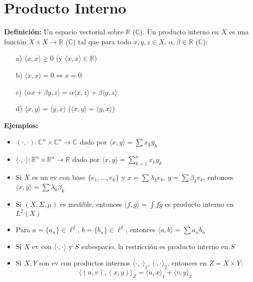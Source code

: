 \documentclass{article}
\begin{document}

\section*{Producto Interno}

\textbf{Definición:} Un espacio vectorial sobre $\mathbb{R}$ ($\mathbb{C}$). Un producto interno en $X$ es una función $X \times X \to \mathbb{R}$ ($\mathbb{C}$) tal que para todo $x, y, z \in X$, $\alpha, \beta \in \mathbb{R}$ ($\mathbb{C}$):
\begin{itemize}
    \item[a)] $\langle x, x \rangle \ge 0$ (y $\langle x, x \rangle \in \mathbb{R}$)
    \item[b)] $\langle x, x \rangle = 0 \iff x = 0$
    \item[c)] $\langle \alpha x + \beta y, z \rangle = \alpha \langle x, z \rangle + \beta \langle y, z \rangle$
    \item[d)] $\langle x, y \rangle = \langle y, x \rangle$ \quad ($\langle x, y \rangle = \overline{\langle y, x \rangle}$)
\end{itemize}

\textbf{Ejemplos:}
\begin{itemize}
    \item $(\cdot, \cdot): \mathbb{C}^n \times \mathbb{C}^n \to \mathbb{C}$ dado por $\langle x, y \rangle = \sum x_k \bar{y}_k$
    \item $\langle \cdot, \cdot \rangle: \mathbb{R}^n \times \mathbb{R}^n \to \mathbb{R}$ dado por $\langle x, y \rangle = \sum_{k=1}^n x_k y_k$
    \item Si $X$ es un ev con base $\{e_1, \dots, e_k\}$ y $x = \sum \lambda_k e_k$, $y = \sum \beta_k e_k$, entonces $\langle x, y \rangle = \sum \lambda_k \bar{\beta}_k$
    \item Si $(X, \Sigma, \mu)$ es medible, entonces $\langle f, g \rangle = \int f \overline{g}$ es producto interno en $L^2(X)$
    \item Para $a = \{a_n\} \in \ell^2$, $b = \{b_n\} \in \ell^2$, entonces $\langle a, b \rangle = \sum a_n \overline{b_n}$
    \item Si $X$ ev con $\langle \cdot, \cdot \rangle$ y $S$ subespacio, la restricción es producto interno en $S$
    \item Si $X, Y$ son ev con productos internos $\langle \cdot, \cdot \rangle_1$, $\langle \cdot, \cdot \rangle_2$, entonces en $Z = X \times Y$:
    \[
    \langle (u, v), (x, y) \rangle_Z = \langle u, x \rangle_1 + \langle v, y \rangle_2
    \]
\end{itemize}
\end{document}
